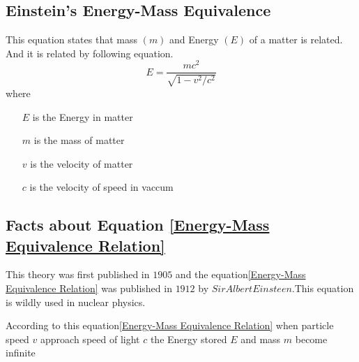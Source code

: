 \subsection{Einstein's Energy-Mass Equivalence}
This equation states that mass $(m)$ and Energy $(E)$ of a matter is related. And it is related by following equation.
\begin{equation}
    E=\frac{mc^2}{\sqrt{1-v^2/c^2}}
    \label{Energy-Mass Equivalence Relation}
\end{equation}
where
\begin{itemize}
    \item[$E$] is the Energy in matter
    \item[$m$] is the mass of matter
    \item[$v$] is the velocity of matter
    \item[$c$] is the velocity of speed in vaccum
\end{itemize}
\subsection{Facts about  Equation 
\ref{Energy-Mass Equivalence Relation}}
This theory was first published in $1905$ and the equation\ref{Energy-Mass Equivalence Relation} was published in $1912$ by $Sir Albert Einsteen$.This equation is wildly used in nuclear physics.


According to this equation\ref{Energy-Mass Equivalence Relation} when particle speed $v$ approach speed of light $c$ the Energy stored $E$ and mass $m$ become infinite

